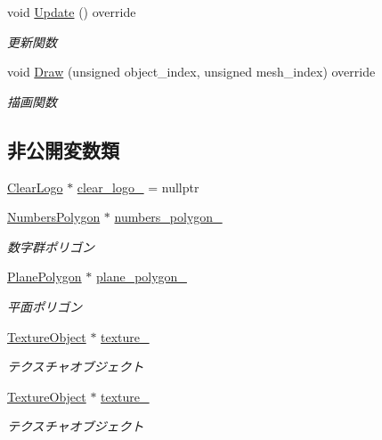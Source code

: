 \begin{DoxyCompactItemize}
void \mbox{\hyperlink{class_clear_logo_draw_a2253a9252d9ba6e23602379404ec92fc}{Update}} () override
\begin{DoxyCompactList}\small\item\em 更新関数 \end{DoxyCompactList}\item 
void \mbox{\hyperlink{class_clear_logo_draw_ab018f370071f370ae7016d8ee402c456}{Draw}} (unsigned object\+\_\+index, unsigned mesh\+\_\+index) override
\begin{DoxyCompactList}\small\item\em 描画関数 \end{DoxyCompactList}\end{DoxyCompactItemize}
\subsection*{非公開変数類}
\begin{DoxyCompactItemize}
\item 
\mbox{\hyperlink{class_clear_logo}{Clear\+Logo}} $\ast$ \mbox{\hyperlink{class_clear_logo_draw_a9cfe2a7655dbda11e6a9719943022327}{clear\+\_\+logo\+\_\+}} = nullptr
\item 
\mbox{\hyperlink{class_numbers_polygon}{Numbers\+Polygon}} $\ast$ \mbox{\hyperlink{class_clear_logo_draw_a556564d76190e945754e26194ef94591}{numbers\+\_\+polygon\+\_\+}}
\begin{DoxyCompactList}\small\item\em 数字群ポリゴン \end{DoxyCompactList}\item 
\mbox{\hyperlink{class_plane_polygon}{Plane\+Polygon}} $\ast$ \mbox{\hyperlink{class_clear_logo_draw_a8d5fe46bbb3bf445ca322555853cf60a}{plane\+\_\+polygon\+\_\+}}
\begin{DoxyCompactList}\small\item\em 平面ポリゴン \end{DoxyCompactList}\item 
\mbox{\hyperlink{class_texture_object}{Texture\+Object}} $\ast$ \mbox{\hyperlink{class_clear_logo_draw_adc0729c654f49a408df7ef53b8db0146}{texture\+\_\+}}
\begin{DoxyCompactList}\small\item\em テクスチャオブジェクト \end{DoxyCompactList}\item 
\mbox{\hyperlink{class_texture_object}{Texture\+Object}} $\ast$ \mbox{\hyperlink{class_clear_logo_draw_a7a48d8631dd9d72bc35d00117a1b1d01}{texture\+\_}}
\begin{DoxyCompactList}\small\item\em テクスチャオブジェクト \end{DoxyCompactList}\end{DoxyCompactItemize}
